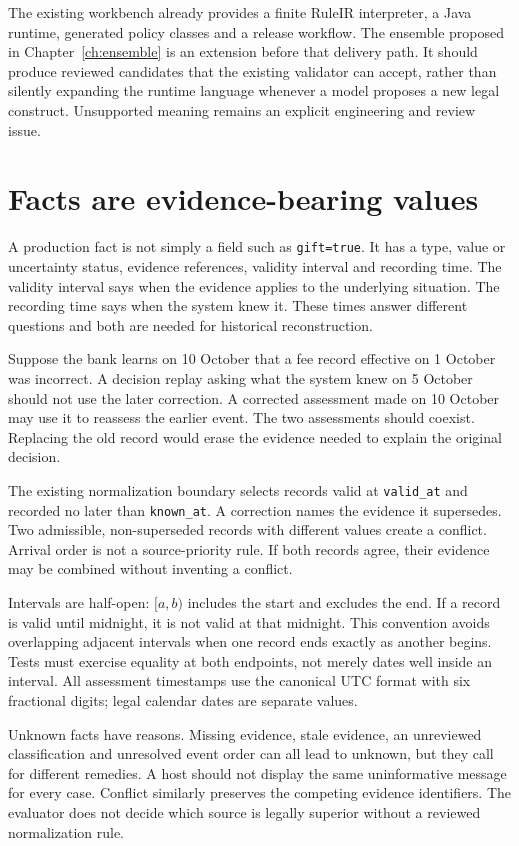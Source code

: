 \documentclass[12pt,a4paper,oneside,openany]{book}
\begin{document}
The existing workbench already provides a finite RuleIR interpreter, a Java
runtime, generated policy classes and a release workflow. The ensemble proposed
in Chapter~\ref{ch:ensemble} is an extension before that delivery path. It should
produce reviewed candidates that the existing validator can accept, rather than
silently expanding the runtime language whenever a model proposes a new legal
construct. Unsupported meaning remains an explicit engineering and review issue.

\section{Facts are evidence-bearing values}

A production fact is not simply a field such as \texttt{gift=true}. It has a type,
value or uncertainty status, evidence references, validity interval and recording
time. The validity interval says when the evidence applies to the underlying
situation. The recording time says when the system knew it. These times answer
different questions and both are needed for historical reconstruction.

Suppose the bank learns on 10 October that a fee record effective on 1 October
was incorrect. A decision replay asking what the system knew on 5 October should
not use the later correction. A corrected assessment made on 10 October may use
it to reassess the earlier event. The two assessments should coexist. Replacing
the old record would erase the evidence needed to explain the original decision.

The existing normalization boundary selects records valid at \texttt{valid\_at}
and recorded no later than \texttt{known\_at}. A correction names the evidence it
supersedes. Two admissible, non-superseded records with different values create a
conflict. Arrival order is not a source-priority rule. If both records agree,
their evidence may be combined without inventing a conflict.

Intervals are half-open: $[a,b)$ includes the start and excludes the end. If a
record is valid until midnight, it is not valid at that midnight. This convention
avoids overlapping adjacent intervals when one record ends exactly as another
begins. Tests must exercise equality at both endpoints, not merely dates well
inside an interval. All assessment timestamps use the canonical UTC format with
six fractional digits; legal calendar dates are separate values.

Unknown facts have reasons. Missing evidence, stale evidence, an unreviewed
classification and unresolved event order can all lead to unknown, but they call
for different remedies. A host should not display the same uninformative message
for every case. Conflict similarly preserves the competing evidence identifiers.
The evaluator does not decide which source is legally superior without a
reviewed normalization rule.
\end{document}
